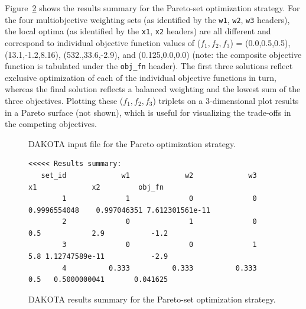 Figure~\ref{strat:figure05} shows the results summary for the
Pareto-set optimization strategy. For the four multiobjective
weighting sets (as identified by the \texttt{w1}, \texttt{w2},
\texttt{w3} headers), the local optima (as identified by the
\texttt{x1}, \texttt{x2} headers) are all different and correspond to
individual objective function values of ($f_1,f_2,f_3$) =
(0.0,0.5,0.5), (13.1,-1.2,8.16), (532.,33.6,-2.9), and (0.125,0.0,0.0)
(note: the composite objective function is tabulated under the
\texttt{obj\_fn} header).  The first three solutions reflect exclusive
optimization of each of the individual objective functions in turn,
whereas the final solution reflects a balanced weighting and the
lowest sum of the three objectives.  Plotting these ($f_1,f_2,f_3$)
triplets on a 3-dimensional plot results in a Pareto surface (not
shown), which is useful for visualizing the trade-offs in the
competing objectives.

\begin{figure}
  \centering
  \begin{bigbox}
    \begin{small}
    \end{small}
  \end{bigbox}
  \caption{DAKOTA input file for the Pareto optimization strategy.}
  \label{strat:figure04}
\end{figure}

\begin{figure}
\centering
\begin{bigbox}
\begin{scriptsize}
\begin{verbatim}
<<<<< Results summary:
   set_id             w1             w2             w3             x1             x2         obj_fn
        1              1              0              0   0.9996554048    0.997046351 7.612301561e-11
        2              0              1              0            0.5            2.9           -1.2
        3              0              0              1            5.8 1.12747589e-11           -2.9
        4          0.333          0.333          0.333            0.5   0.5000000041       0.041625
\end{verbatim}
\end{scriptsize}
\end{bigbox}
\caption{DAKOTA results summary for the Pareto-set optimization
  strategy.}
\label{strat:figure05}
\end{figure}

